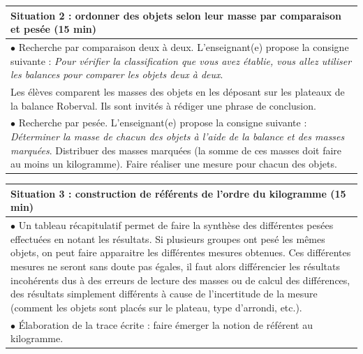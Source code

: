 {\begin{exercice*}
\smallskip

\begin{tabular}{|p{17cm}|}
   \hline
   Situation 2 : ordonner des objets selon leur masse par comparaison et pesée (15 min) \\
   \hline
   $\bullet$ Recherche par comparaison deux à deux. L'enseignant(e) propose la consigne suivante : {\it Pour vérifier la classification que vous avez établie, vous allez utiliser les balances pour comparer les objets deux à deux}. \\
   Les élèves comparent les masses des objets en les déposant sur les plateaux de la balance Roberval. Ils sont invités à rédiger une phrase de conclusion. \\
   $\bullet$ Recherche par pesée. L'enseignant(e) propose la consigne suivante : {\it Déterminer la masse de chacun des objets à l’aide de la balance et des masses marquées}. Distribuer des masses marquées (la somme de ces masses doit faire au moins un kilogramme). Faire réaliser une mesure pour chacun des objets. \\
   \hline
\end{tabular}

\smallskip

\begin{tabular}{|p{17cm}|}
   \hline
   Situation 3 : construction de référents de l’ordre du kilogramme (15 min) \\
   \hline
   $\bullet$ Un tableau récapitulatif permet de faire la synthèse des différentes pesées effectuées en notant les résultats. Si plusieurs groupes ont pesé les mêmes objets, on peut faire apparaitre les différentes mesures obtenues. Ces différentes mesures ne seront sans doute pas égales, il faut alors différencier les résultats incohérents dus à des erreurs de lecture des masses ou de calcul des différences, des résultats simplement différents à cause de l’incertitude de la mesure (comment les objets sont placés sur le plateau, type d’arrondi, etc.). \\
   $\bullet$ Élaboration de la trace écrite : faire émerger la notion de référent au kilogramme. \\
   \hline
\end{tabular}

\end{exercice*}


}
